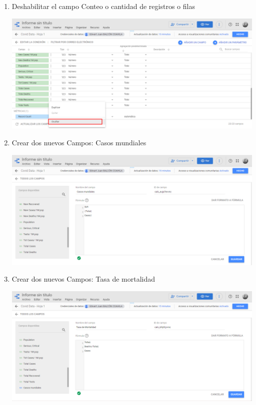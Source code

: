 \documentclass{article}
\begin{document}
\begin{enumerate}[\tab 1.]
\begin{center}
        \end{center}
        \item Deshabilitar el campo Conteo o cantidad de registros o filas
        \begin{center}
            \includegraphics[width=13cm]{./images/13.png}
        \end{center}
        \newpage
        \item Crear dos nuevos Campos: Casos mundiales
        \begin{center}
            \includegraphics[width=13cm]{./images/14.png}
        \end{center}
        \newpage
        \item Crear dos nuevos Campos: Tasa de mortalidad
        \begin{center}
            \includegraphics[width=13cm]{./images/15.png}
        \end{center}
       
    \end{enumerate}
    
\end{document}
